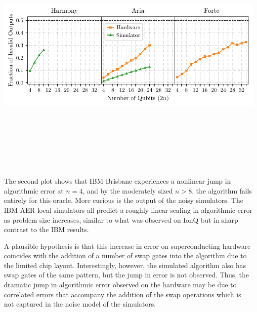 \documentclass[portrait,a0b,final]{a0poster}
\newenvironment{poster}{
  \begin{center}
  \begin{minipage}[c]{0.98\textwidth}
}{
  \end{minipage} 
  \end{center}
}
\newenvironment{pcolumn}[1]{
  \begin{minipage}{#1\textwidth}
  \begin{center}
}{
  \end{center}
  \end{minipage}
}
\begin{document}
\begin{poster}
\begin{center}
\begin{pcolumn}{0.495}
{\begin{center}
  \includegraphics[height=12cm,angle=0]{IonQComparisonTest.pdf}
\end{center}

The second plot shows that IBM Brisbane experiences a nonlinear jump in algorithmic error at $n=4$, and by the moderately sized $n>8$, the algorithm fails entirely for this oracle.
More curious is the output of the noisy simulators.
The IBM AER local simulators all predict a roughly linear scaling in algorithmic error as problem size increases, similar to what was observed on IonQ but in sharp contrast to the IBM results.

A plausible hypothesis is that this increase in error on superconducting hardware coincides with the addition of a number of swap gates into the algorithm due to the limited chip layout.
Interestingly, however, the simulated algorithm also has swap gates of the same pattern, but the jump in error is not observed.
Thus, the dramatic jump in algorithmic error observed on the hardware may be due to correlated errors that accompany the addition of the swap operations which is not captured in the noise model of the simulators. 

}
\end{pcolumn}
\end{center}
\end{poster}
\end{document}
